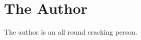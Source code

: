 \documentclass[../main.tex]{subfiles}
\begin{document}
\chapter*{The Author}
The author is an all round cracking person.
\end{document}
